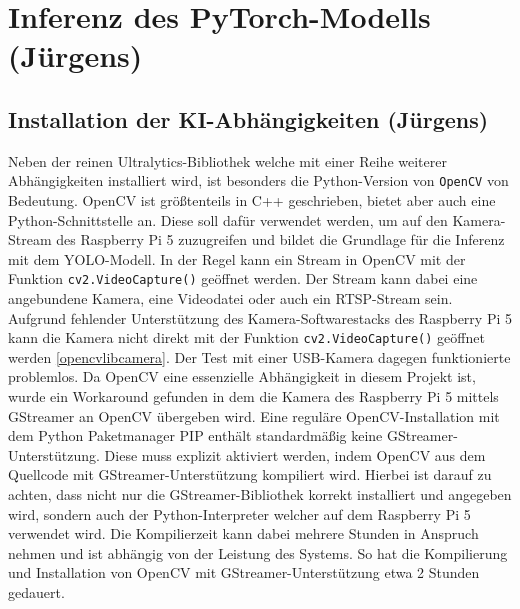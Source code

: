 \section{Inferenz des PyTorch-Modells (Jürgens)}

\subsection{Installation der KI-Abhängigkeiten (Jürgens)} 
Neben der reinen Ultralytics-Bibliothek welche mit einer Reihe weiterer Abhängigkeiten installiert wird, ist besonders die Python-Version von \texttt{OpenCV} von Bedeutung. 
OpenCV ist größtenteils in C++ geschrieben, bietet aber auch eine Python-Schnittstelle an. Diese soll dafür verwendet werden, um auf den Kamera-Stream des Raspberry Pi 5 zuzugreifen und bildet die Grundlage für die Inferenz mit dem YOLO-Modell. 
In der Regel kann ein Stream in OpenCV mit der Funktion \texttt{cv2.VideoCapture()} geöffnet werden. Der Stream kann dabei eine angebundene Kamera, eine Videodatei oder auch ein RTSP-Stream sein. Aufgrund fehlender Unterstützung des Kamera-Softwarestacks des Raspberry Pi 5 kann die Kamera nicht direkt mit der Funktion \texttt{cv2.VideoCapture()} geöffnet werden \ref{opencvlibcamera}. Der Test mit einer USB-Kamera dagegen funktionierte problemlos. Da OpenCV eine essenzielle Abhängigkeit in diesem Projekt ist, wurde ein Workaround gefunden in dem die Kamera des Raspberry Pi 5 mittels GStreamer an OpenCV übergeben wird. Eine reguläre OpenCV-Installation mit dem Python Paketmanager PIP enthält standardmäßig keine GStreamer-Unterstützung. Diese muss explizit aktiviert werden, indem OpenCV aus dem Quellcode mit GStreamer-Unterstützung kompiliert wird. Hierbei ist darauf zu achten, dass nicht nur die GStreamer-Bibliothek korrekt installiert und angegeben wird, sondern auch der Python-Interpreter welcher auf dem Raspberry Pi 5 verwendet wird. Die Kompilierzeit kann dabei mehrere Stunden in Anspruch nehmen und ist abhängig von der Leistung des Systems. So hat die Kompilierung und Installation von OpenCV mit GStreamer-Unterstützung etwa 2 Stunden gedauert. 


